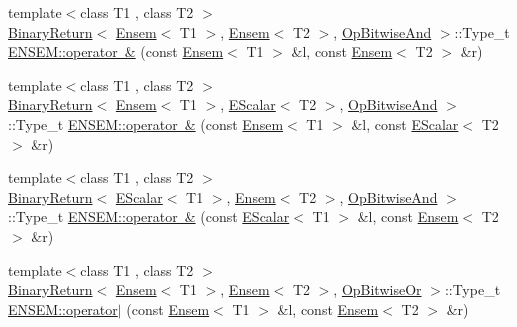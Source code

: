\begin{DoxyCompactItemize}
\item 
{\footnotesize template$<$class T1 , class T2 $>$ }\\\mbox{\hyperlink{structENSEM_1_1BinaryReturn}{Binary\+Return}}$<$ \mbox{\hyperlink{classENSEM_1_1Ensem}{Ensem}}$<$ T1 $>$, \mbox{\hyperlink{classENSEM_1_1Ensem}{Ensem}}$<$ T2 $>$, \mbox{\hyperlink{structENSEM_1_1OpBitwiseAnd}{Op\+Bitwise\+And}} $>$\+::Type\+\_\+t \mbox{\hyperlink{group__eensem_gaeb51787a8e99aa2d96b292b6b53160fb}{E\+N\+S\+E\+M\+::operator \&}} (const \mbox{\hyperlink{classENSEM_1_1Ensem}{Ensem}}$<$ T1 $>$ \&l, const \mbox{\hyperlink{classENSEM_1_1Ensem}{Ensem}}$<$ T2 $>$ \&r)
\item 
{\footnotesize template$<$class T1 , class T2 $>$ }\\\mbox{\hyperlink{structENSEM_1_1BinaryReturn}{Binary\+Return}}$<$ \mbox{\hyperlink{classENSEM_1_1Ensem}{Ensem}}$<$ T1 $>$, \mbox{\hyperlink{classENSEM_1_1EScalar}{E\+Scalar}}$<$ T2 $>$, \mbox{\hyperlink{structENSEM_1_1OpBitwiseAnd}{Op\+Bitwise\+And}} $>$\+::Type\+\_\+t \mbox{\hyperlink{group__eensem_gadd38c6dbde8cad60658e2a3429480978}{E\+N\+S\+E\+M\+::operator \&}} (const \mbox{\hyperlink{classENSEM_1_1Ensem}{Ensem}}$<$ T1 $>$ \&l, const \mbox{\hyperlink{classENSEM_1_1EScalar}{E\+Scalar}}$<$ T2 $>$ \&r)
\item 
{\footnotesize template$<$class T1 , class T2 $>$ }\\\mbox{\hyperlink{structENSEM_1_1BinaryReturn}{Binary\+Return}}$<$ \mbox{\hyperlink{classENSEM_1_1EScalar}{E\+Scalar}}$<$ T1 $>$, \mbox{\hyperlink{classENSEM_1_1Ensem}{Ensem}}$<$ T2 $>$, \mbox{\hyperlink{structENSEM_1_1OpBitwiseAnd}{Op\+Bitwise\+And}} $>$\+::Type\+\_\+t \mbox{\hyperlink{group__eensem_ga81252fa8c928f420f2676e632c49a421}{E\+N\+S\+E\+M\+::operator \&}} (const \mbox{\hyperlink{classENSEM_1_1EScalar}{E\+Scalar}}$<$ T1 $>$ \&l, const \mbox{\hyperlink{classENSEM_1_1Ensem}{Ensem}}$<$ T2 $>$ \&r)
\item 
{\footnotesize template$<$class T1 , class T2 $>$ }\\\mbox{\hyperlink{structENSEM_1_1BinaryReturn}{Binary\+Return}}$<$ \mbox{\hyperlink{classENSEM_1_1Ensem}{Ensem}}$<$ T1 $>$, \mbox{\hyperlink{classENSEM_1_1Ensem}{Ensem}}$<$ T2 $>$, \mbox{\hyperlink{structENSEM_1_1OpBitwiseOr}{Op\+Bitwise\+Or}} $>$\+::Type\+\_\+t \mbox{\hyperlink{group__eensem_ga535dbb02f2bee6036e22a754b7144be1}{E\+N\+S\+E\+M\+::operator$\vert$}} (const \mbox{\hyperlink{classENSEM_1_1Ensem}{Ensem}}$<$ T1 $>$ \&l, const \mbox{\hyperlink{classENSEM_1_1Ensem}{Ensem}}$<$ T2 $>$ \&r)
\item 

\end{DoxyCompactItemize}
